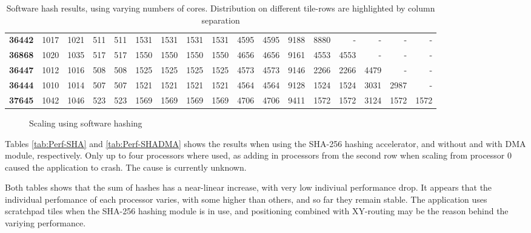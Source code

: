 \begin{flushleft}
\begin{table}
\begin{tabular}{| l || r r r r | r r r r | r r r | r r r r r |}
  \textbf{36442} & 1017 & 1021 & 511 & 511 & 1531 & 1531 & 1531 & 1531 & 4595 & 4595 & 9188 & 8880 & - & - & - & -\\
  \textbf{36868} & 1020 & 1035 & 517 & 517 & 1550 & 1550 & 1550 & 1550 & 4656 & 4656 & 9161 & 4553 & 4553 & - & - & -\\
  \textbf{36447} & 1012 & 1016 & 508 & 508 & 1525 & 1525 & 1525 & 1525 & 4573 & 4573 & 9146 & 2266 & 2266 & 4479 & - & -\\
  \textbf{36444} & 1010 & 1014 & 507 & 507 & 1521 & 1521 & 1521 & 1521 & 4564 & 4564 & 9128 & 1524 & 1524 & 3031 & 2987 & -\\
  \textbf{37645} & 1042 & 1046 & 523 & 523 & 1569 & 1569 & 1569 & 1569 & 4706 & 4706 & 9411 & 1572 & 1572 & 3124 & 1572 & 1572\\
  \hline  
\end{tabular}
\caption{Software hash results, using varying numbers of cores. Distribution on different tile-rows are highlighted by column separation}
\label{tab:Perf-SW}
\end{table}
\end{flushleft}

\begin{figure}
	\caption{Scaling using software hashing}
	\label{fig:sw-scaling}
\end{figure}

Tables \ref{tab:Perf-SHA} and \ref{tab:Perf-SHADMA} shows the results when using the SHA-256 hashing accelerator, and without and with DMA module, respectively.
Only up to four processors where used, as adding in processors from the second row when scaling from processor 0 caused the application to crash.
The cause is currently unknown.

Both tables shows that the sum of hashes has a near-linear increase, with very low indiviual performance drop.
It appears that the individual perfomance of each processor varies, with some higher than others, and so far they remain stable. 
The application uses scratchpad tiles when the SHA-256 hashing module is in use, and positioning combined with XY-routing may be the reason behind the variying performance.

